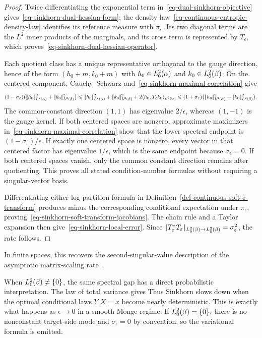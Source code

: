 \begin{proof}
	Twice differentiating the exponential term in~\eqref{eq-dual-sinkhorn-objective} gives~\eqref{eq-sinkhorn-dual-hessian-form}; the density law~\eqref{eq-continuous-entropic-density-law} identifies its reference measure with $\pi_\epsilon$. Its two diagonal terms are the $L^2$ inner products of the marginals, and its cross term is represented by $T_\epsilon$, which proves~\eqref{eq-sinkhorn-dual-hessian-operator}.

	Each quotient class has a unique representative orthogonal to the gauge direction, hence of the form
	\(
		(h_0+m,k_0+m)
	\)
	with $h_0\in L_0^2(\alpha)$ and $k_0\in L_0^2(\beta)$. On the centered component, Cauchy--Schwarz and~\eqref{eq-sinkhorn-maximal-correlation} give
	\[
		(1-\sigma_\epsilon)
		\bigl(\norm{h_0}_{L^2(\al)}^2+\norm{k_0}_{L^2(\be)}^2\bigr)
		\leq
		\norm{h_0}_{L^2(\al)}^2+\norm{k_0}_{L^2(\be)}^2
		+2\langle h_0,T_\epsilon k_0\rangle_{L^2(\al)}
		\leq
		(1+\sigma_\epsilon)
		\bigl(\norm{h_0}_{L^2(\al)}^2+\norm{k_0}_{L^2(\be)}^2\bigr).
	\]
	The common-constant direction $(1,1)$ has eigenvalue $2/\epsilon$, whereas $(1,-1)$ is the gauge kernel. If both centered spaces are nonzero, approximate maximizers in~\eqref{eq-sinkhorn-maximal-correlation} show that the lower spectral endpoint is $(1-\sigma_\epsilon)/\epsilon$. If exactly one centered space is nonzero, every vector in that centered factor has eigenvalue $1/\epsilon$, which is the same endpoint because $\sigma_\epsilon=0$. If both centered spaces vanish, only the common constant direction remains after quotienting. This proves all stated condition-number formulas without requiring a singular-vector basis.

	Differentiating either log-partition formula in Definition~\ref{def-continuous-soft-c-transform} produces minus the corresponding conditional expectation under $\pi_\epsilon$, proving~\eqref{eq-sinkhorn-soft-transform-jacobians}. The chain rule and a Taylor expansion then give~\eqref{eq-sinkhorn-local-error}. Since
	\(|\!| T_\varepsilon^*T_\varepsilon |\!|_{L_0^2(\beta)\to L_0^2(\beta)}
	=\sigma_\varepsilon^2\),
	the rate follows.
\end{proof}

In finite spaces, this recovers the second-singular-value description of the asymptotic matrix-scaling rate~\cite{knight2008sinkhorn,lehmann2022overrelaxation}.

When $L_0^2(\beta)\neq\{0\}$, the same spectral gap has a direct probabilistic interpretation. The law of total variance gives
Thus Sinkhorn slows down when the optimal conditional laws $Y|X=x$ become nearly deterministic. This is exactly what happens as $\epsilon\to0$ in a smooth Monge regime. If $L_0^2(\beta)=\{0\}$, there is no nonconstant target-side mode and $\sigma_\epsilon=0$ by convention, so the variational formula is omitted.


